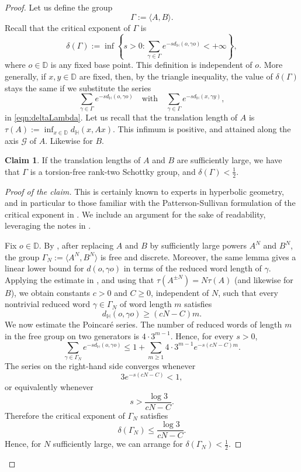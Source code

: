 \documentclass[12pt,a4paper,reqno]{amsart}
\theoremstyle{definition}
\newtheorem*{claim}{Claim}
\renewcommand{\leq}{\leqslant}
\renewcommand{\geq}{\geqslant}
\begin{document}
{\begin{proof}
Let us define the group
\[
\Gamma:=\langle A,B\rangle.
\]
Recall that the critical exponent of $\Gamma$ is
\begin{equation}\label{eqn:deltaLambda}
\delta(\Gamma)
:=
\inf\left\{
s>0:
\sum_{\gamma\in\Gamma}
e^{-s d_{\mathbb H}(o,\gamma o)}
<+\infty
\right\},
\end{equation}
where $o\in\mathbb D$ is any fixed base point. This definition is independent
of $o$. More generally, if $x,y\in\mathbb D$ are fixed, then, by the triangle inequality, the value of $\delta(\Gamma)$ stays the same if we substitute the series
\[
\sum_{\gamma\in\Gamma} e^{-s d_{\mathbb H}(o,\gamma o)}\quad \text{with}\quad \sum_{\gamma\in\Gamma} e^{-s d_{\mathbb H}(x,\gamma y)},
\]
in \eqref{eqn:deltaLambda}.
Let us recall that the translation length of $A$ is $\tau(A):=\inf_{x\in \mathbb D}d_{\mathbb H}(x,Ax)$. This infimum is positive, and attained along the axis $\mathcal{G}$ of $A$. Likewise for $B$.

\begin{claim}
    If the translation lengths of $A$ and $B$ are sufficiently large, we have that $\Gamma$ is a torsion-free rank-two Schottky group, and $\delta(\Gamma)<\frac{1}{2}$.
\end{claim}

\begin{proof}[Proof of the claim]
    This is certainly known to experts in hyperbolic geometry, and in particular to those familiar with the Patterson-Sullivan formulation of the critical exponent in
\cite{PattersonExponent,PattersonLimit,SullivanDensity}. We include an argument for the sake of readability, leveraging the notes in \cite{QuintPS}. 

Fix $o\in\mathbb D$. By \cite[Lemma 4.6]{QuintPS}, after replacing $A$ and $B$
by sufficiently large powers $A^N$ and $B^N$, the group $\Gamma_N:=\langle A^N,B^N\rangle$
is free and discrete. Moreover, the same lemma gives a linear lower bound
for $d(o,\gamma o)$ in terms of the reduced word length of $\gamma$. Applying the estimate in \cite[Lemma~4.6]{QuintPS}, and using that $\tau(A^{\pm N})=N\tau(A)$ (and likewise for $B$), we
obtain constants $c>0$ and $C\geq 0$, independent of $N$, such that every
nontrivial reduced word $\gamma\in\Gamma_N$ of word length $m$ satisfies
\[
d_{\mathbb H}(o,\gamma o)\geq (cN-C)m .
\]
We now estimate the Poincaré series. The number of reduced words of length
$m$ in the free group on two generators is $4\cdot 3^{m-1}$. Hence, for
every $s>0$,
\[
\sum_{\gamma\in\Gamma_N} e^{-s d_{\mathbb H}(o,\gamma o)}
\leq
1+\sum_{m\geq1}4\cdot 3^{m-1}e^{-s(cN-C)m}.
\]
The series on the right-hand side converges whenever
\[
3e^{-s(cN-C)}<1,
\]
or equivalently whenever
\[
s>\frac{\log 3}{cN-C}.
\]
Therefore the critical exponent of $\Gamma_N$ satisfies
\[
\delta(\Gamma_N)\leq \frac{\log 3}{cN-C}.
\]
Hence, for $N$ sufficiently large, we can arrange for $
\delta(\Gamma_N)<\frac12$.
\end{proof}


\end{proof}}
\end{document}
